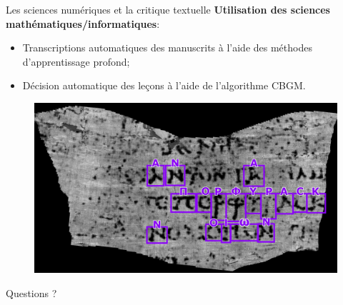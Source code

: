 \documentclass[11pt]{beamer}
\begin{document}
\begin{frame}{Les sciences numériques et la critique textuelle}
    \textbf{Utilisation des sciences mathématiques/informatiques}:
    \begin{itemize}
        \item Transcriptions automatiques des manuscrits à l'aide des méthodes d'apprentissage profond;
        \item Décision automatique des leçons à l'aide de l'algorithme CBGM.
    \end{itemize}

    \begin{figure}
        \centering
        \includegraphics[width=0.5\linewidth]{img/vision_papyrus.JPG}
    \end{figure}
\end{frame}

\begin{frame}{}
Questions ?
\end{frame}
\end{document}
